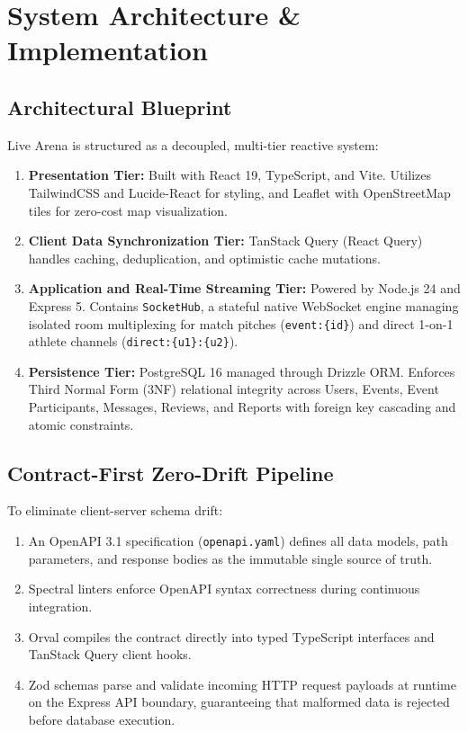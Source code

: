 \documentclass[conference]{IEEEtran}
\begin{document}
\section{System Architecture \& Implementation}

\subsection{Architectural Blueprint}
Live Arena is structured as a decoupled, multi-tier reactive system:
\begin{enumerate}
    \item \textbf{Presentation Tier:} Built with React 19, TypeScript, and Vite. Utilizes TailwindCSS and Lucide-React for styling, and Leaflet with OpenStreetMap tiles for zero-cost map visualization.
    \item \textbf{Client Data Synchronization Tier:} TanStack Query (React Query) handles caching, deduplication, and optimistic cache mutations.
    \item \textbf{Application and Real-Time Streaming Tier:} Powered by Node.js 24 and Express 5. Contains \texttt{SocketHub}, a stateful native WebSocket engine managing isolated room multiplexing for match pitches (\texttt{event:\{id\}}) and direct 1-on-1 athlete channels (\texttt{direct:\{u1\}:\{u2\}}).
    \item \textbf{Persistence Tier:} PostgreSQL 16 managed through Drizzle ORM. Enforces Third Normal Form (3NF) relational integrity across Users, Events, Event Participants, Messages, Reviews, and Reports with foreign key cascading and atomic constraints.
\end{enumerate}

\subsection{Contract-First Zero-Drift Pipeline}
To eliminate client-server schema drift:
\begin{enumerate}
    \item An OpenAPI 3.1 specification (\texttt{openapi.yaml}) defines all data models, path parameters, and response bodies as the immutable single source of truth.
    \item Spectral linters enforce OpenAPI syntax correctness during continuous integration.
    \item Orval compiles the contract directly into typed TypeScript interfaces and TanStack Query client hooks.
    \item Zod schemas parse and validate incoming HTTP request payloads at runtime on the Express API boundary, guaranteeing that malformed data is rejected before database execution.
\end{enumerate}
\end{document}
